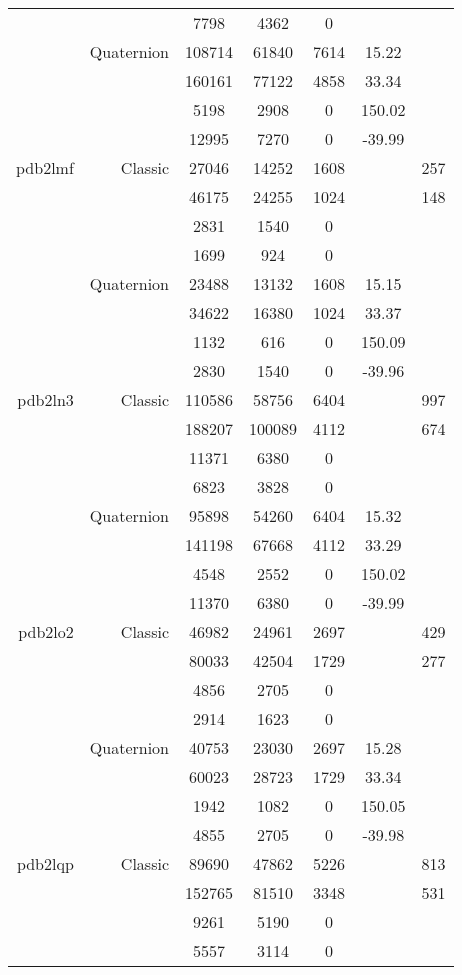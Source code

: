 \begin{xltabular}{\textwidth}{r|rcccSc}
& & 7798 & 4362 & 0 & & \\
& Quaternion & 108714 & 61840 & 7614 & 15.22 & \\
& & 160161 & 77122 & 4858 & 33.34 & \\
& & 5198 & 2908 & 0 & 150.02 & \\
& & 12995 & 7270 & 0 & -39.99 & \\ \addlinespace
pdb2lmf & Classic & 27046 & 14252 & 1608 & & 257 \\
& & 46175 & 24255 & 1024 & & 148 \\
& & 2831 & 1540 & 0 & & \\
& & 1699 & 924 & 0 & & \\
& Quaternion & 23488 & 13132 & 1608 & 15.15 & \\
& & 34622 & 16380 & 1024 & 33.37 & \\
& & 1132 & 616 & 0 & 150.09 & \\
& & 2830 & 1540 & 0 & -39.96 & \\ \addlinespace
pdb2ln3 & Classic & 110586 & 58756 & 6404 & & 997 \\
& & 188207 & 100089 & 4112 & & 674 \\
& & 11371 & 6380 & 0 & & \\
& & 6823 & 3828 & 0 & & \\
& Quaternion & 95898 & 54260 & 6404 & 15.32 & \\
& & 141198 & 67668 & 4112 & 33.29 & \\
& & 4548 & 2552 & 0 & 150.02 & \\
& & 11370 & 6380 & 0 & -39.99 & \\ \addlinespace
pdb2lo2 & Classic & 46982 & 24961 & 2697 & & 429 \\
& & 80033 & 42504 & 1729 & & 277 \\
& & 4856 & 2705 & 0 & & \\
& & 2914 & 1623 & 0 & & \\
& Quaternion & 40753 & 23030 & 2697 & 15.28 & \\
& & 60023 & 28723 & 1729 & 33.34 & \\
& & 1942 & 1082 & 0 & 150.05 & \\
& & 4855 & 2705 & 0 & -39.98 & \\ \addlinespace
pdb2lqp & Classic & 89690 & 47862 & 5226 & & 813 \\
& & 152765 & 81510 & 3348 & & 531 \\
& & 9261 & 5190 & 0 & & \\
& & 5557 & 3114 & 0 & & \\

\end{xltabular}
